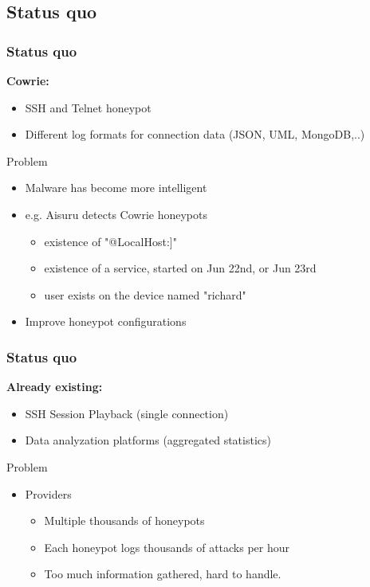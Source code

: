 \documentclass[11pt,t,usepdftitle=false,aspectratio=169]{beamer}
\begin{document}
\subsection{Status quo}
\begin{frame}
	\frametitle{Status quo}	
	\textbf{Cowrie:}
	\begin{itemize}
		\item SSH and Telnet honeypot
		\item Different log formats for connection data (JSON, UML, MongoDB,..)
	\end{itemize}
	
	\begin{alertblock}{Problem}
		\begin{itemize}
			\item Malware has become more intelligent 
			\item e.g. Aisuru detects Cowrie honeypots
			\begin{itemize}
				\item existence of "@LocalHost:]"
				\item existence of a service, started on Jun 22nd, or Jun 23rd
				\item user exists on the device named "richard"
			\end{itemize}
			\item Improve honeypot configurations
		\end{itemize}
	\end{alertblock}	
\end{frame}

\begin{frame}
	\frametitle{Status quo}
	
	\textbf{Already existing:}
	\begin{itemize}
		\item SSH Session Playback (single connection)
		\item Data analyzation platforms (aggregated statistics)
	\end{itemize}
	
	\begin{alertblock}{Problem}
		\begin{itemize}
			\item Providers
			\begin{itemize}
				\item Multiple thousands of honeypots 
				\item Each honeypot logs thousands of attacks per hour
				\item Too much information gathered, hard to handle.
			\end{itemize}
		\end{itemize}
	\end{alertblock}	
\end{frame}
\end{document}

